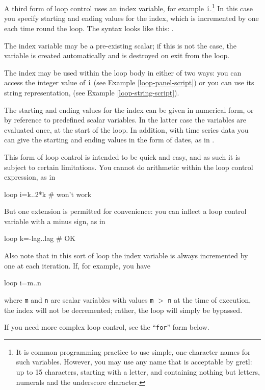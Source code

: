 A third form of loop control uses an index variable, for example
\verb+i+.\footnote{It is common programming practice to use simple,
  one-character names for such variables.  However, you may use any
  name that is acceptable by gretl: up to 15 characters, starting with
  a letter, and containing nothing but letters, numerals and the
  underscore character.}  In this case you specify starting and ending
values for the index, which is incremented by one each time round the
loop.  The syntax looks like this: .

The index variable may be a pre-existing scalar; if this is not the
case, the variable is created automatically and is destroyed on exit
from the loop.

The index may be used within the loop body in either of two ways: you
can access the integer value of \verb+i+ (see Example
\ref{loop-panel-script}) or you can use its string representation,
 (see Example \ref{loop-string-script}).

The starting and ending values for the index can be given in numerical
form, or by reference to predefined scalar variables.  In the latter
case the variables are evaluated once, at the start of the loop.  In
addition, with time series data you can give the starting and ending
values in the form of dates, as in .

This form of loop control is intended to be quick and easy, and as
such it is subject to certain limitations.  You cannot do arithmetic
within the loop control expression, as in
\begin{code}
loop i=k..2*k # won't work
\end{code}
But one extension is permitted for convenience: you can inflect a loop
control variable with a minus sign, as in
\begin{code}
loop k=-lag..lag # OK
\end{code}

Also note that in this sort of loop the index variable is always
incremented by one at each iteration.  If, for example, you have
\begin{code}
loop i=m..n
\end{code}
where \texttt{m} and \texttt{n} are scalar variables with values
\texttt{m} $>$ \texttt{n} at the time of execution, the index will not
be decremented; rather, the loop will simply be bypassed.

If you need more complex loop control, see the ``\texttt{for}'' form
below.

